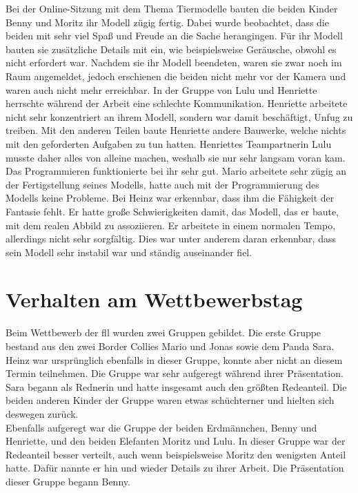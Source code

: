 Bei der Online-Sitzung mit dem Thema Tiermodelle  bauten die beiden Kinder Benny und Moritz ihr Modell zügig fertig. Dabei wurde beobachtet, dass die beiden mit sehr viel Spaß und Freude an die Sache herangingen. Für ihr Modell bauten sie zusätzliche Details mit ein, wie beispielsweise Geräusche, obwohl es nicht erfordert war. Nachdem sie ihr Modell beendeten, waren sie zwar noch im Raum angemeldet, jedoch erschienen die beiden nicht mehr vor der Kamera und waren auch nicht mehr erreichbar. In der Gruppe von Lulu und Henriette herrschte während der Arbeit eine schlechte Kommunikation. Henriette arbeitete nicht sehr konzentriert an ihrem Modell, sondern war damit beschäftigt, Unfug zu treiben. Mit den anderen Teilen baute Henriette andere Bauwerke, welche nichts mit den geforderten Aufgaben zu tun hatten. Henriettes Teampartnerin Lulu musste daher alles von alleine machen, weshalb sie nur sehr langsam voran kam. Das Programmieren funktionierte bei ihr sehr gut. Mario arbeitete sehr zügig an der Fertigstellung seines Modells, hatte auch mit der Programmierung des Modells keine Probleme. Bei Heinz war erkennbar, dass ihm die Fähigkeit der Fantasie fehlt. Er hatte große Schwierigkeiten damit, das Modell, das er baute, mit dem realen Abbild zu assoziieren. Er arbeitete in einem normalen Tempo, allerdings nicht sehr sorgfältig. Dies war unter anderem daran erkennbar, dass sein Modell sehr instabil war und ständig auseinander fiel.

\section{Verhalten am Wettbewerbstag}

Beim Wettbewerb der \acrshort{fll} wurden zwei Gruppen gebildet. Die erste Gruppe bestand aus den zwei Border Collies Mario und Jonas sowie dem Panda Sara. Heinz war ursprünglich ebenfalls in dieser Gruppe, konnte aber nicht an diesem Termin teilnehmen. Die Gruppe war sehr aufgeregt während ihrer Präsentation. Sara begann als Rednerin und hatte insgesamt auch den größten Redeanteil. Die beiden anderen Kinder der Gruppe waren etwas schüchterner und hielten sich deswegen zurück.\\
Ebenfalls aufgeregt war die Gruppe der beiden Erdmännchen, Benny und Henriette, und den beiden Elefanten Moritz und Lulu. In dieser Gruppe war der Redeanteil besser verteilt, auch wenn beispielsweise Moritz den wenigsten Anteil hatte. Dafür nannte er hin und wieder Details zu ihrer Arbeit. Die Präsentation dieser Gruppe begann Benny.

